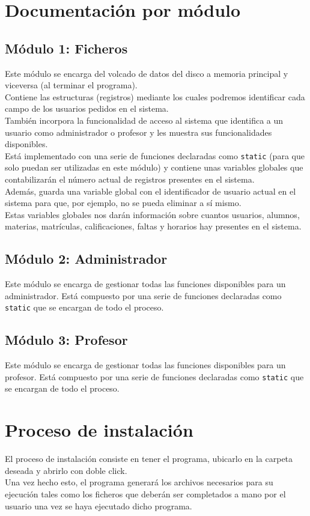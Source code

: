\documentclass{book}
\begin{document}
\section{Documentación por módulo}
\subsection{Módulo 1: Ficheros}{
Este módulo se encarga del volcado de datos del disco a memoria principal y viceversa (al terminar el programa).\\
Contiene las estructuras (registros) mediante los cuales podremos identificar cada campo de los usuarios pedidos en el sistema.\\
También incorpora la funcionalidad de acceso al sistema que identifica a un usuario como administrador o profesor y les muestra sus funcionalidades disponibles.\\
Está implementado con una serie de funciones declaradas como \texttt{static} (para que solo puedan ser utilizadas en este módulo) y contiene unas variables globales que contabilizarán el número actual de registros presentes en el sistema.\\
Además, guarda una variable global con el identificador de usuario actual en el sistema para que, por ejemplo, no se pueda eliminar a sí mismo.\\
Estas variables globales nos darán información sobre cuantos usuarios, alumnos, materias, matrículas, calificaciones, faltas y horarios hay presentes en el sistema.
}
\subsection{Módulo 2: Administrador}{
Este módulo se encarga de gestionar todas las funciones disponibles para un administrador. Está compuesto por una serie de funciones declaradas como \texttt{static} que se encargan de todo el proceso.
}
\subsection{Módulo 3: Profesor}{
Este módulo se encarga de gestionar todas las funciones disponibles para un profesor. Está compuesto por una serie de funciones declaradas como \texttt{static} que se encargan de todo el proceso.
}

\section{Proceso de instalación}
El proceso de instalación consiste en tener el programa, ubicarlo en la carpeta deseada y abrirlo con doble click.\\
Una vez hecho esto, el programa generará los archivos necesarios para su ejecución tales como los ficheros que deberán ser completados a mano por el usuario una vez se haya ejecutado dicho programa.
\end{document}

